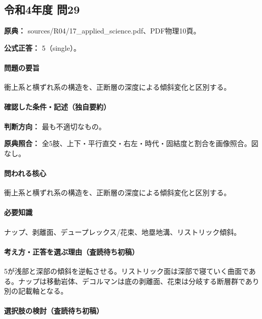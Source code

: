 \subsection{令和4年度 問29}
\label{q:r04-reg-applied-29}

\noindent\textbf{原典：} sources/R04/17\_applied\_science.pdf、PDF物理10頁。

\textbf{公式正答：} 5（single）。

\paragraph{問題の要旨} 衝上系と横ずれ系の構造を、正断層の深度による傾斜変化と区別する。

\paragraph{確認した条件・記述（独自要約）}\mbox{}\par

\noindent\textbf{判断方向：} 最も不適切なもの。\par

\noindent\textbf{原典照合：} 全5肢、上下・平行直交・右左・時代・固結度と割合を画像照合。図なし。\par

\paragraph{問われる核心} 衝上系と横ずれ系の構造を、正断層の深度による傾斜変化と区別する。

\paragraph{必要知識} ナップ、剥離面、デュープレックス/花束、地塁地溝、リストリック傾斜。

\paragraph{考え方・正答を選ぶ理由（査読待ち初稿）} 5が浅部と深部の傾斜を逆転させる。リストリック面は深部で寝ていく曲面である。ナップは移動岩体、デコルマンは底の剥離面、花束は分岐する断層群であり別の記載軸となる。

\paragraph{選択肢の検討（査読待ち初稿）}\mbox{}\par

